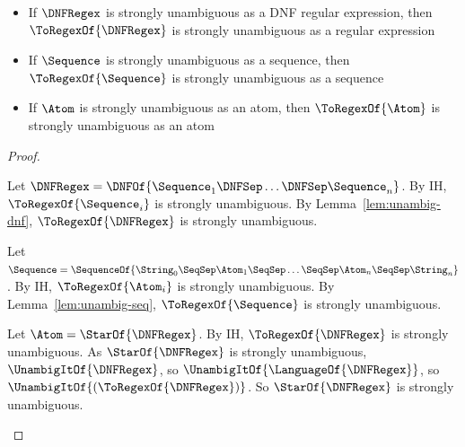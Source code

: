 \documentclass[sigplan,acmsmall]{acmart}
\begin{document}
\begin{lemma}\leavevmode
  \label{lem:retaining-unambiguity-toregex}
  \begin{itemize}
  \item 
    If $\DNFRegex$ is strongly unambiguous as a DNF regular expression, then
    $\ToRegexOf{\DNFRegex}$ is strongly unambiguous as a regular expression
  \item
    If $\Sequence$ is strongly unambiguous as a sequence, then
    $\ToRegexOf{\Sequence}$ is strongly unambiguous as a sequence
  \item
    If $\Atom$ is strongly unambiguous as an atom, then
    $\ToRegexOf{\Atom}$ is strongly unambiguous as an atom
  \end{itemize}
\end{lemma}
\begin{proof}
  \begin{case}[\MultiOrDNFRegexType{}]
    Let $\DNFRegex = \DNFOf{\Sequence_1 \DNFSep \ldots \DNFSep \Sequence_n}$.
    By IH, $\ToRegexOf{\Sequence_i}$ is strongly unambiguous.
    By Lemma~\ref{lem:unambig-dnf}, $\ToRegexOf{\DNFRegex}$ is strongly
    unambiguous.
  \end{case}

  \begin{case}[\MultiConcatSequenceType{}]
    Let $\Sequence = \SequenceOf{\String_0 \SeqSep \Atom_1 \SeqSep \ldots \SeqSep \Atom_n \SeqSep \String_n}$.
    By IH, $\ToRegexOf{\Atom_i}$ is strongly unambiguous.
    By Lemma~\ref{lem:unambig-seq}, $\ToRegexOf{\Sequence}$ is strongly
    unambiguous.
  \end{case}

  \begin{case}[StarAtomType]
    Let $\Atom = \StarOf{\DNFRegex}$.
    By IH, $\ToRegexOf{\DNFRegex}$ is strongly unambiguous.
    As $\StarOf{\DNFRegex}$ is strongly unambiguous, $\UnambigItOf{\DNFRegex}$,
    so $\UnambigItOf{\LanguageOf{\DNFRegex}}$, so
    $\UnambigItOf{(\ToRegexOf{\DNFRegex})}$.
    So $\StarOf{\DNFRegex}$ is strongly unambiguous.
  \end{case}
\end{proof}
\end{document}
